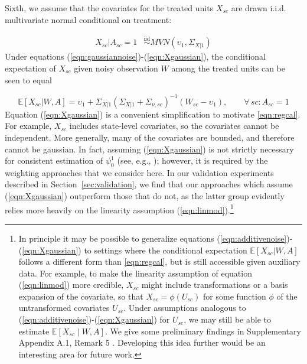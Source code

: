 \documentclass[aoas]{imsart}
\theoremstyle{plain}
\theoremstyle{remark}
\begin{document}
Sixth, we assume that the covariates for the treated units $X_{sc}$ are drawn i.i.d. multivariate normal conditional on treatment:

\begin{align} \label{eqn:Xgaussian}
    X_{sc}|A_{sc} = 1 & \stackrel{\text{iid}}{\sim} MVN(\upsilon_1, \Sigma_{X|1})%
\end{align}
%
Under equations (\ref{eqn:gaussiannoise})-(\ref{eqn:Xgaussian}), the conditional expectation of $X_{sc}$ given noisy observation $W$ among the treated units can be seen to equal 

\begin{equation} \label{eqn:regcal}
\mathbb{E}[X_{sc}| W, A] = \upsilon_1 + \Sigma_{X|1} \left(\Sigma_{X|1} + \Sigma_{\nu, sc}\right)^{-1}  (W_{sc} - \upsilon_1), \qquad \forall\, sc: A_{sc} = 1
\end{equation}
%
Equation (\ref{eqn:Xgaussian}) is a convenient simplification to motivate \eqref{eqn:regcal}. For example, $X_{sc}$ includes state-level covariates, so the covariates cannot be independent. More generally, many of the covariates are bounded, and therefore cannot be gaussian. In fact, assuming (\ref{eqn:Xgaussian}) is not strictly necessary for consistent estimation of $\psi_0^1$ (see, e.g., \cite{gleser1992importance}); however, it is required by the weighting approaches that we consider here. In our validation experiments described in Section~\ref{sec:validation}, we find that our approaches which assume (\ref{eqn:Xgaussian}) outperform those that do not, as the latter group evidently relies more heavily on the linearity assumption (\ref{eqn:linmod}).\footnote{In principle it may be possible to generalize equations (\ref{eqn:additivenoise})-(\ref{eqn:Xgaussian}) to settings where the conditional expectation $\mathbb{E}[X_{sc}|W,A]$ follows a different form than \eqref{eqn:regcal}, but is still accessible given auxiliary data. For example, to make the linearity assumption of equation (\ref{eqn:linmod}) more credible, $X_{sc}$ might include transformations or a basis expansion of the covariate, so that $X_{sc} = \phi(U_{sc})$ for some function $\phi$ of the untransformed covariates $U_{sc}$. Under assumptions analogous to (\ref{eqn:additivenoise})-(\ref{eqn:Xgaussian}) for $U_{sc}$, we may still be able to estimate $\mathbb{E}[X_{sc} \mid W, A]$. We give some preliminary findings in Supplementary Appendix A.1, Remark 5 \citep{supplement}. Developing this idea further would be an interesting area for future work.}
 
\end{document}
